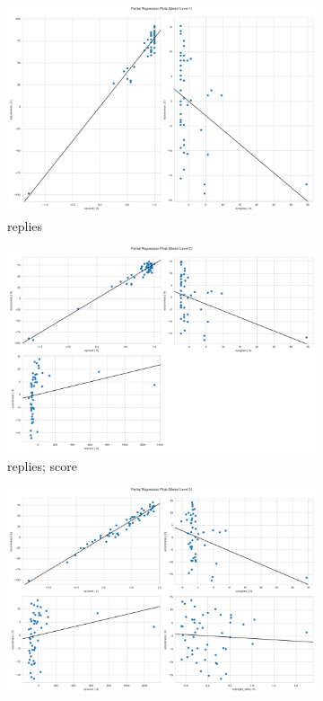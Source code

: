 \documentclass[11pt, oneside]{article}   	%
\begin{document}
\begin{figure}[H]
\centering
\begin{subfigure}{.5\textwidth}
  \centering
  \includegraphics[width=\linewidth]{../plots/full_data/hierarchy8/partial_regression_0}
  \caption{replies}
\end{subfigure}%
\begin{subfigure}{.5\textwidth}
  \centering
  \includegraphics[width=\linewidth]{../plots/full_data/hierarchy8/partial_regression_1}
  \caption{replies; score}
\end{subfigure}
\begin{subfigure}{.5\textwidth}
  \centering
  \includegraphics[width=\linewidth]{../plots/full_data/hierarchy8/partial_regression_2}

\end{subfigure}
\end{figure}
\end{document}
